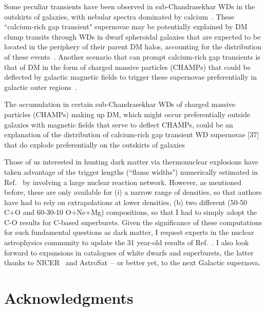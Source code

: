 \documentclass[
    twocolumn,
	prd,
        amssymb,
	preprintnumbers,
	secnumarabic,
	nofootinbib,
	superscriptaddress]{revtex4-1}
\begin{document}
Some peculiar transients have been observed in sub-Chandrasekhar WDs in the outskirts of galaxies, with nebular spectra dominated by calcium~\cite{KasliwalCaRichTransients:2011se}.
These ``calcium-rich gap transient" supernovae may be potentially explained by DM clump transits through WDs in dwarf spheroidal galaxies that are expected to be located in the periphery of their parent DM halos, accounting for the distribution of these events~\cite{SmirnovLindenCaRichTransients:2022zip}. 
Another scenario that can prompt calcium-rich gap transients is that of DM in the form of charged massive particles (CHAMPs) that could be deflected by galactic magnetic fields to trigger these supernovae preferentially in galactic outer regions~\cite{FedderkeWDCHAMPs:2019jur}.

The accumulation in certain sub-Chandrasekhar WDs of charged massive particles (CHAMPs) making up DM, which might occur preferentially outside galaxies with magnetic fields that serve to deflect CHAMPs, could be an explanation of the distribution of calcium-rich gap transient WD supernovae [37] that do explode preferentially on the outskirts of galaxies 

Those of us interested in hunting dark matter via thermonuclear explosions have taken advantage of the trigger lengths (``flame widths") numerically estimated in Ref.~\cite{TimmesWoosley1992} by involving a large nuclear reaction network.
However, as mentioned before, these are only available for (i) a narrow range of densities, so that authors have had to rely on extrapolations at lower densities, (b) two different (50-50 C+O and 60-30-10 O+Ne+Mg) compositions, so that I had to simply adopt the C-O results for C-based superbursts. 
Given the significance of these computations for such fundamental questions as dark matter, I request experts in the nuclear astrophysics community to update the 31 year-old results of Ref.~\cite{TimmesWoosley1992}.
I also look forward to expansions in catalogues of white dwarfs and superbursts, the latter thanks to NICER~\cite{supburst:NICERearly} and AstroSat~\cite{supburst:Astrosat}-- or better yet, to the next Galactic supernova.
 
\section*{Acknowledgments}
\end{document}
